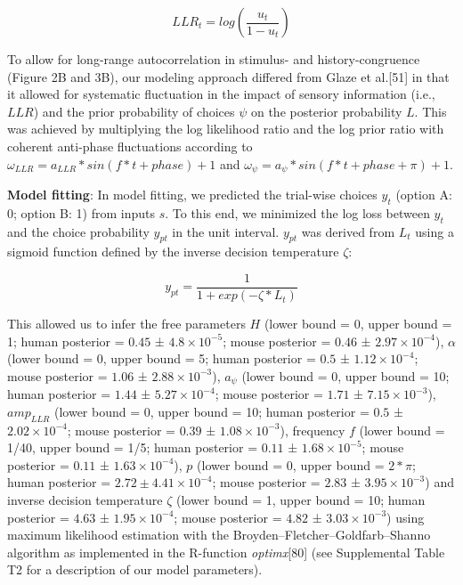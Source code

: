 \documentclass[
]{article}
\begin{document}
\begin{equation}
LLR_t = log(\frac{u_t}{1-u_t})
\end{equation}

To allow for long-range autocorrelation in stimulus- and
history-congruence (Figure 2B and 3B), our modeling approach differed
from Glaze et al.{[}51{]} in that it allowed for systematic fluctuation
in the impact of sensory information (i.e., \(LLR\)) and the prior
probability of choices \(\psi\) on the posterior probability \(L\). This
was achieved by multiplying the log likelihood ratio and the log prior
ratio with coherent anti-phase fluctuations according to
\(\omega_{LLR} = a_{LLR} * sin(f * t + phase) + 1\) and
\(\omega_{\psi} = a_{\psi} * sin(f * t + phase + \pi) + 1\).

\textbf{Model fitting}: In model fitting, we predicted the trial-wise
choices \(y_t\) (option A: 0; option B: 1) from inputs \(s\). To this
end, we minimized the log loss between \(y_t\) and the choice
probability \(y_{p t}\) in the unit interval. \(y_{p t}\) was derived
from \(L_t\) using a sigmoid function defined by the inverse decision
temperature \(\zeta\):

\begin{equation}
y_{p t} = \frac{1}{1 + exp(-\zeta * L_t)}
\end{equation}

This allowed us to infer the free parameters \(H\) (lower bound = 0,
upper bound = 1; human posterior = \(0.45\) ±
\(\ensuremath{4.8\times 10^{-5}}\); mouse posterior = \(0.46\) ±
\(\ensuremath{2.97\times 10^{-4}}\)), \(\alpha\) (lower bound = 0, upper
bound = 5; human posterior = \(0.5\) ±
\(\ensuremath{1.12\times 10^{-4}}\); mouse posterior = \(1.06\) ±
\(\ensuremath{2.88\times 10^{-3}}\)), \(a_{\psi}\) (lower bound = 0,
upper bound = 10; human posterior = \(1.44\) ±
\(\ensuremath{5.27\times 10^{-4}}\); mouse posterior = \(1.71\) ±
\(\ensuremath{7.15\times 10^{-3}}\)), \(amp_{LLR}\) (lower bound = 0,
upper bound = 10; human posterior = \(0.5\) ±
\(\ensuremath{2.02\times 10^{-4}}\); mouse posterior = \(0.39\) ±
\(\ensuremath{1.08\times 10^{-3}}\)), frequency \(f\) (lower bound =
1/40, upper bound = 1/5; human posterior = \(0.11\) ±
\(\ensuremath{1.68\times 10^{-5}}\); mouse posterior = \(0.11\) ±
\(\ensuremath{1.63\times 10^{-4}}\)), \(p\) (lower bound = 0, upper
bound = \(2*\pi\); human posterior =
\(2.72 ± \ensuremath{4.41\times 10^{-4}}\); mouse posterior = \(2.83\) ±
\(\ensuremath{3.95\times 10^{-3}}\)) and inverse decision temperature
\(\zeta\) (lower bound = 1, upper bound = 10; human posterior = \(4.63\)
± \(\ensuremath{1.95\times 10^{-4}}\); mouse posterior = \(4.82\) ±
\(\ensuremath{3.03\times 10^{-3}}\)) using maximum likelihood estimation
with the Broyden--Fletcher--Goldfarb--Shanno algorithm as implemented in
the R-function \emph{optimx}{[}80{]} (see Supplemental Table T2 for a
description of our model parameters).
\end{document}
